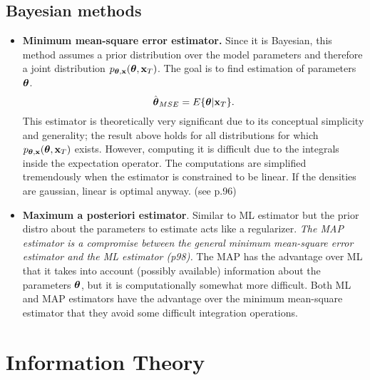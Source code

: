 \documentclass[a4paper]{book}
\begin{document}
\section{Bayesian methods}
\begin{itemize}
\item \textbf{Minimum mean-square error estimator.} Since it is Bayesian, this method assumes a prior distribution over the model parameters and therefore a joint distribution $p_{\boldsymbol{\theta},\mathbf{x}}(\boldsymbol{\theta},\mathbf{x}_T)$. The goal is to find estimation of parameters $\boldsymbol{\theta}$.%
$$ \hat{\boldsymbol{\theta}}_{MSE} = E\{\boldsymbol{\theta}|\mathbf{x}_T\} .$$
%
This estimator is theoretically very significant due to its conceptual simplicity and generality; the result above holds for all distributions for which $p_{\boldsymbol{\theta},\mathbf{x}}(\boldsymbol{\theta},\mathbf{x}_T)$ exists. However, computing it is difficult due to the integrals inside the expectation operator.
%
The computations are simplified tremendously when the estimator is constrained to be linear. If the densities are gaussian, linear is optimal anyway. (see p.96)
%
\item \textbf{Maximum a posteriori estimator}. Similar to ML estimator but the prior distro about the parameters to estimate acts like a regularizer. \textit{The MAP estimator is a compromise between the general minimum mean-square error estimator and the ML estimator (p98).} The MAP has the advantage over ML that it takes into account (possibly available) information about the parameters $\boldsymbol{\theta}$, but it is computationally somewhat more difficult. Both ML and MAP estimators have the advantage over the minimum mean-square estimator that they avoid some difficult integration operations. 
\end{itemize}









\chapter{Information Theory}
\end{document}
